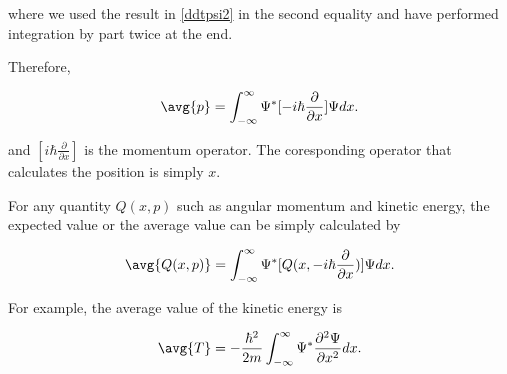 \documentclass[a4paper,12pt]{report}
\begin{document}
where we used the result in \cref{ddtpsi2} in the second equality and have performed integration by part twice at the end.
	
Therefore,

\begin{equation}
  \avg{p} = \int_{-\infty}^{\infty} \Psi ^* [-i\hbar \frac{\partial }{\partial x} ] \Psi dx.
\end{equation}

and \([i\hbar \frac{\partial }{\partial x} ]\) is the momentum operator. The coresponding operator that calculates the position is simply \(x\).
	
For any quantity \(Q(x,p)\) such as angular momentum and kinetic energy, the expected value or the average value can be simply calculated by 
	
\begin{equation}
  \avg{Q(x,p)} = \int_{-\infty}^{\infty} \Psi ^* [Q(x, -i\hbar \frac{\partial }{\partial x} )] \Psi dx. 
\end{equation}

For example, the average value of the kinetic energy is 
	
\begin{equation}
  \avg{T} = -\frac{\hbar ^2 }{2m} \int_{-\infty}^{\infty} \Psi ^* \frac{\partial^2 \Psi }{\partial x^2} dx.  
\end{equation}
\end{document}
